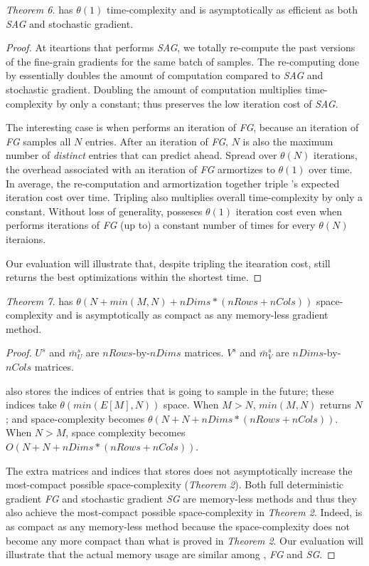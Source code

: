 \emph{Theorem 6.}
\tool has $\theta(1)$ time-complexity and is asymptotically as efficient as both \emph{SAG} and stochastic gradient.
\begin{proof}
At iteartions that \tool performs \emph{SAG}, we totally re-compute the past versions of the fine-grain gradients for the same batch of samples. 
The re-computing done by \tool essentially doubles the amount of computation compared to \emph{SAG} and stochastic gradient.
Doubling the amount of computation multiplies time-complexity by only a constant; 
thus \tool preserves the low iteration cost of \emph{SAG}.

The interesting case is when \tool performs an iteration of \emph{FG}, because an iteration of \emph{FG} samples all $N$ entries.
After an iteration of \emph{FG}, $N$ is also the maximum number of \emph{distinct} entries that \tool can predict ahead. 
Spread over $\theta(N)$ iterations, the overhead associated with an iteration of \emph{FG} armortizes to $\theta(1)$ over time.
In average, the re-computation and armortization together triple \tool's expected iteration cost over time. 
Tripling also multiplies overall time-complexity by only a constant. 
Without loss of generality, \tool posseses $\theta(1)$ iteration cost even when \tool performs iterations of \emph{FG} (up to) a constant number of times for every $\theta(N)$ iteraions.

Our evaluation will illustrate that, despite tripling the itearation cost, \tool still returns the best optimizations within the shortest time.
\end{proof}


\emph{Theorem 7.}
\tool has $\theta(N + min(M,N) + nDims*(nRows+nCols))$ space-complexity and is asymptotically as compact as any memory-less gradient method.
\begin{proof}
$U^{s}$ and $\bar{m}_U^{s}$ are $nRows$-by-$nDims$ matrices.
$V^{s}$ and $\bar{m}_V^{s}$ are $nDims$-by-$nCols$ matrices.

\tool also stores the indices of entries that \tool is going to sample in the future; these indices take $\theta(min(E[M],N))$ space.
When $M > N$, $min(M,N)$ returns $N$; and space-complexity becomes $\theta(N + N + nDims*(nRows+nCols))$.
When $N > M$, space complexity becomes $O(N + N + nDims*(nRows+nCols))$.

The extra matrices and indices that \tool stores does not asymptotically increase the most-compact possible space-complexity (\emph{Theorem 2}).
Both full deterministic gradient \emph{FG} and stochastic gradient \emph{SG} are memory-less methods and thus they also achieve the most-compact possible space-complexity in \emph{Theorem 2}.
Indeed, \tool is as compact as any memory-less method because the space-complexity does not become any more compact than what is proved in \emph{Theorem 2}.
Our evaluation will illustrate that the actual memory usage are similar among \tool, \emph{FG} and \emph{SG}.
\end{proof}
